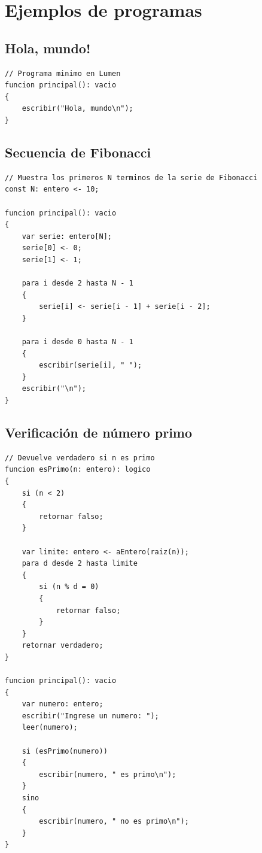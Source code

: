 \documentclass[spanish,11pt,letterpaper]{article}
\begin{document}
	\newpage
	
	\section{Ejemplos de programas}
	\subsection{Hola, mundo!}
	\begin{lstlisting}
// Programa minimo en Lumen
funcion principal(): vacio
{
	escribir("Hola, mundo\n");
}
	\end{lstlisting}
	
	\subsection{Secuencia de Fibonacci}
	\begin{lstlisting}
// Muestra los primeros N terminos de la serie de Fibonacci
const N: entero <- 10;

funcion principal(): vacio
{
	var serie: entero[N];
	serie[0] <- 0;
	serie[1] <- 1;
	
	para i desde 2 hasta N - 1
	{
		serie[i] <- serie[i - 1] + serie[i - 2];
	}
	
	para i desde 0 hasta N - 1
	{
		escribir(serie[i], " ");
	}
	escribir("\n");
}
	\end{lstlisting}
	
	\clearpage
	
	\subsection{Verificaci\'on de n\'umero primo}
	\begin{lstlisting}
// Devuelve verdadero si n es primo
funcion esPrimo(n: entero): logico
{
	si (n < 2)
	{
		retornar falso;
	}
	
	var limite: entero <- aEntero(raiz(n));
	para d desde 2 hasta limite
	{
		si (n % d = 0)
		{
			retornar falso;
		}
	}
	retornar verdadero;
}

funcion principal(): vacio
{
	var numero: entero;
	escribir("Ingrese un numero: ");
	leer(numero);
	
	si (esPrimo(numero))
	{
		escribir(numero, " es primo\n");
	}
	sino
	{
		escribir(numero, " no es primo\n");
	}
}
	\end{lstlisting}
	
\end{document}
